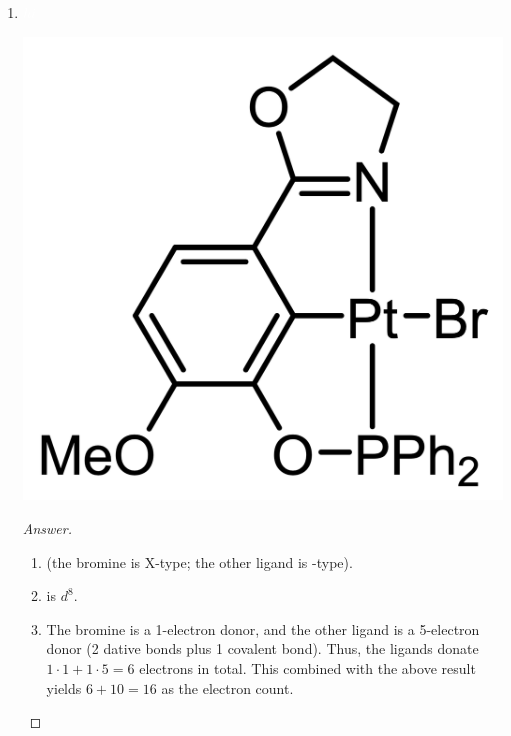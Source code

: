 \documentclass[../psets.tex]{subfiles}
\begin{document}
\begin{enumerate}
\begin{enumerate}[label={\arabic*)}]
        \begin{proof}[Answer]\leavevmode
            \begin{enumerate}[label={(\roman*)}]
                \item {} (the $t$-butoxide is X-type; both Cp groups are X-type; the  bond makes no contribution), and  (both carbonyls are L-type; the Cp is X-type; the  bond makes no contribution).
                \item {} is $d^1$, and  is $d^7$.
                \item For the zirconium atom, the $t$-butoxide group is a 1-electron donor, both Cp groups are 5-electron donors, and the  bond is a 1-electron donor. Thus, the ligands donate $1\cdot 1+2\cdot 5+1\cdot 1=12$ electrons in total to the zirconium atom. This combined with the above results yields $12+4=16$ as the electron count for the zirconium atom. For the ruthenium atom, both carbonyls are 2-electron donors, the Cp group is a 5-electron donor, and the  bond is a 1-electron donor. Thus, the ligands donate $2\cdot 2+1\cdot 5+1\cdot 1=10$ electrons in total. This combined with the above results yields $10+8=18$ as the electron count for the ruthenium atom. It follows that there should be $\frac{36-(16+18)}{2}=1$ extra  bond beyond what is shown in the above picture (2 in total).
            \end{enumerate}
        \end{proof}
        \item ${\color{white}hi}$
        \begin{center}
            \includegraphics[width=0.25\linewidth]{../ExtFiles/pset1-1-19.png}
        \end{center}
        \begin{proof}[Answer]\leavevmode
            \begin{enumerate}[label={(\roman*)}]
                \item {} (the bromine is X-type; the other ligand is -type).
                \item {} is $d^8$.
                \item The bromine is a 1-electron donor, and the other ligand is a 5-electron donor (2 dative bonds plus 1 covalent bond). Thus, the ligands donate $1\cdot 1+1\cdot 5=6$ electrons in total. This combined with the above result yields $6+10=16$ as the electron count.

\end{enumerate}
\end{proof}
\end{enumerate}
\end{enumerate}
\end{document}

